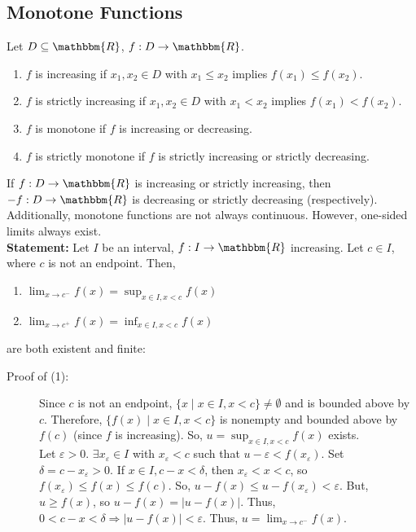 \documentclass[10pt]{extarticle}
\newcommand{\R}{\mathbbm{R}}
\begin{document}
  \subsection{Monotone Functions}%
    Let $D\subseteq \R$, $f: D\rightarrow \R$. 
    \begin{enumerate}[(1)]
      \item $f$ is increasing if $x_1,x_2\in D$ with $x_1\leq x_2$ implies $f(x_1)\leq f(x_2)$.
      \item $f$ is strictly increasing if $x_1,x_2\in D$ with $x_1 < x_2$ implies $f(x_1) < f(x_2)$.
      \item $f$ is monotone if $f$ is increasing or decreasing.
      \item $f$ is strictly monotone if $f$ is strictly increasing or strictly decreasing.
    \end{enumerate}
    If $f: D\rightarrow \R$ is increasing or strictly increasing, then $-f: D\rightarrow \R$ is decreasing or strictly decreasing (respectively).\\

    Additionally, monotone functions are not always continuous. However, one-sided limits always exist.\\

    \textbf{Statement:} Let $I$ be an interval, $f: I\rightarrow \R$ increasing. Let $c\in I$, where $c$ is not an endpoint. Then,
    \begin{enumerate}[(1)]
      \item $\lim_{x\rightarrow c^-}f(x) = \sup_{x\in I,x< c}f(x)$
      \item $\lim_{x\rightarrow c^+}f(x) = \inf_{x\in I,x < c}f(x)$
    \end{enumerate}
    are both existent and finite:
    \begin{description}
      \item[Proof of (1):] Since $c$ is not an endpoint, $\{x\mid x\in I,x< c\}\neq \emptyset$ and is bounded above by $c$. Therefore, $\{f(x)\mid x\in I, x < c\}$ is nonempty and bounded above by $f(c)$ (since $f$ is increasing). So, $u = \sup_{x\in I,x < c}f(x)$ exists.\\

        Let $\varepsilon > 0$. $\exists x_{\varepsilon}\in I$ with $x_{\varepsilon} < c$ such that $ u - \varepsilon < f(x_{\varepsilon}) $. Set $\delta = c-x_{\varepsilon} > 0$. If $x\in I,c-x < \delta$, then $x_{\varepsilon} < x < c$, so $f(x_{\varepsilon}) \leq f(x) \leq f(c)$. So, $u - f(x) \leq u-f(x_{\varepsilon}) < \varepsilon$. But, $u \geq f(x)$, so $u-f(x) = |u-f(x)|$. Thus, $0 < c-x < \delta \Rightarrow |u-f(x)| < \varepsilon$. Thus, $u = \lim_{x\rightarrow c^-}f(x)$.
    \end{description}
\end{document}

